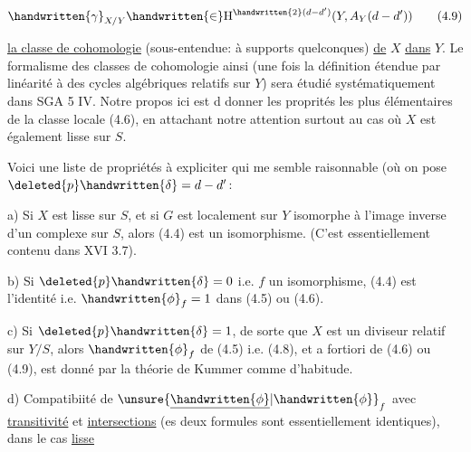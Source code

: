 \[
\handwritten{\gamma}_{X/Y}\handwritten{\in}\mathrm{H}^{\handwritten{2}(d-d')}(Y,A_Y(d-d'))
\tag*{(4.9)}
\]

\uline{la classe de cohomologie} (sous-entendue: à supports quelconques) \uline{de} $X$ \uline{dans} $Y$. Le formalisme des classes de cohomologie ainsi   (une fois la définition étendue par linéarité à des cycles algébriques relatifs sur $Y$) sera étudié systématiquement dans SGA 5 IV. Notre propos ici est d donner  les proprités les plus élémentaires de la classe locale (4.6), en attachant notre attention surtout au cas où $X$ est également lisse sur $S$.

Voici une liste de propriétés à expliciter qui me semble raisonnable\deleted{\unsure{;|:}} (où on pose $\deleted{p}\handwritten{\delta}=d-d'$\deleted{\unsure{;|:}}\handwritten{)}:

a) Si $X$ est lisse sur $S$, et si $G$ est localement sur $Y$ isomorphe à l'image inverse d'un complexe sur $S$, alors (4.4) est un isomorphisme. (C'est essentiellement contenu dans XVI 3.7).

b) Si $\deleted{p}\handwritten{\delta}=0$ i.e. $f$ un isomorphisme, (4.4) est l'identité i.e. $\handwritten{\phi}_f=1$ dans (4.5) ou (4.6).

c) Si $\deleted{p}\handwritten{\delta}=1$, de sorte que $X$ est un diviseur relatif sur $Y/S$, alors $\handwritten{\phi}_f$ de (4.5) i.e. (4.8), et a fortiori de (4.6) ou (4.9), est donné par la théorie de Kummer comme d'habitude.

d) Compatibiité de $\unsure{\underline{\handwritten{\phi}}|\handwritten{\phi}}_f$ avec \uline{transitivité} et \uline{intersections} (es deux formules sont essentiellement identiques), dans le cas \uline{lisse}

